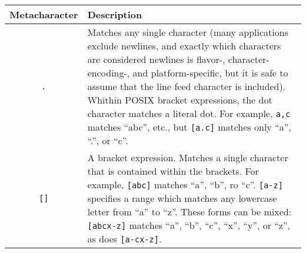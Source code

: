\begin{tabularx}{\textwidth}{|c|X|}
  \hline
  \textbf{Metacharacter} & \textbf{Description} \\
  \hline
  \verb|.| & Matches any single character (many applications exclude
  newlines, and exactly which characters are considered newlines is flavor-,
  character-encoding-, and platform-specific, but it is safe to assume that
  the line feed character is included). Whithin POSIX bracket expressions,
  the dot character matches a literal dot. For example, \verb|a,c| matches
  ``abc'', etc., but \verb|[a.c]| matches only ``a'', ``.'', or ``c''.\\
  \hline
  \verb|[]| & A bracket expression. Matches a single character that is
  contained within the brackets. For example, \verb|[abc]| matches ``a'',
  ``b'', ro ``c''. \verb|[a-z]| specifies a range which matches any lowercase
  letter from ``a'' to ``z''. These forms can be mixed: \verb|[abcx-z]|
  matches ``a'', ``b'', ``c'', ``x'', ``y'', or ``z'', as does
  \verb|[a-cx-z]|.


\end{tabularx}
